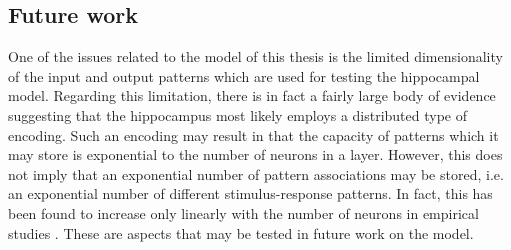 





\subsection*{Future work}


One of the issues related to the model of this thesis is the limited dimensionality of the input and output patterns which are used for testing the hippocampal model. Regarding this limitation, there is in fact a fairly large body of evidence suggesting that the hippocampus most likely employs a distributed type of encoding. Such an encoding may result in that the capacity of patterns which it may store is exponential to the number of neurons in a layer.
However, this does not imply that an exponential number of pattern associations may be stored, i.e. an exponential number of different stimulus-response patterns. In fact, this has been found to increase only linearly with the number of neurons in empirical studies \citep{Rolls1998chpt6}. These are aspects that may be tested in future work on the model.

